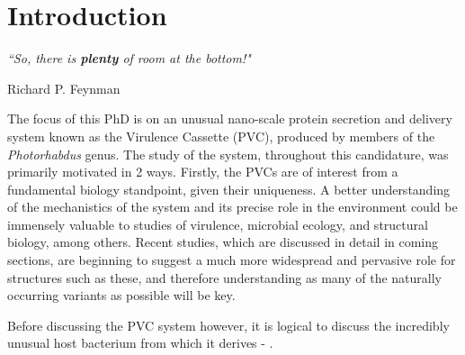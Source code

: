 
\pagestyle{IHA-fancy-style}

\chapter{Introduction}\label{intro}

\epigraph{\textit{``So, there is \textbf{plenty} of room at the bottom!"}}{Richard P. Feynman}

The focus of this PhD is on an unusual nano-scale protein secretion and delivery system known as the \Pa{} Virulence Cassette (PVC), produced by members of the \emph{Photorhabdus} genus. The study of the system, throughout this candidature, was primarily motivated in 2 ways. Firstly, the PVCs are of interest from a fundamental biology standpoint, given their uniqueness. A better understanding of the mechanistics of the system and its precise role in the environment could be immensely valuable to studies of virulence, microbial ecology, and structural biology, among others. Recent studies, which are discussed in detail in coming sections, are beginning to suggest a much more widespread and pervasive role for structures such as these, and therefore understanding as many of the naturally occurring variants as possible will be key. 



Before discussing the PVC system however, it is logical to discuss the incredibly unusual host bacterium from which it derives - \Pa.

\section{\Pa}

